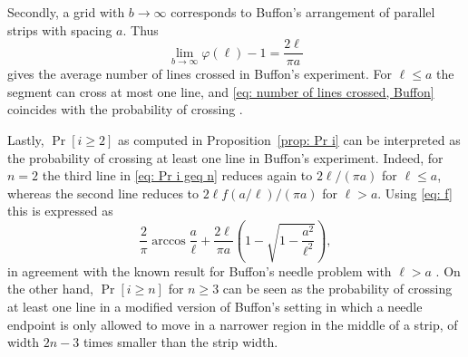 \documentclass[12pt, a4paper]{article}
\newcommand{\funta}{\varphi} %
\newcommand{\len}{\ell} %
\begin{document}
Secondly, a grid with $b \rightarrow \infty$ corresponds to Buffon's arrangement of parallel strips with spacing $a$. Thus
\begin{equation}
\label{eq: number of lines crossed, Buffon}
\lim_{b \rightarrow \infty} \funta(\len)-1 = \frac{2\len}{\pi a}
\end{equation}
gives the average number of lines crossed in Buffon's experiment. For $\len \leq a$ the segment can cross at most one line, and \eqref{eq: number of lines crossed, Buffon} coincides with the probability of crossing \cite[theorem 1.1.1]{Mathai99}.

Lastly, $\Pr[i \geq 2]$ as computed in Proposition~\ref{prop: Pr i} can be interpreted as the probability of crossing at least one line in Buffon's experiment. Indeed, for $n=2$ the third line in \eqref{eq: Pr i geq n} reduces again to $2\len/(\pi a)$ for $\len \leq a$, whereas the second line reduces to $2\len f(a/\len)/(\pi a)$ for $\len > a$. Using \eqref{eq: f} this is expressed as
\[
\frac 2 \pi \arccos\frac a \len + \frac{2\len}{\pi a} \left(1 - \sqrt{1-\frac{a^2}{\len^2}} \right),
\]
in agreement with the known result for Buffon's needle problem with $\len > a$ \cite[theorem 1.1.2]{Mathai99}. On the other hand, $\Pr[i \geq n]$ for $n \geq 3$ can be seen as the probability of crossing at least one line in a modified version of Buffon's setting in which a needle endpoint is only allowed to move in a narrower region in the middle of a strip, of width $2n-3$ times smaller than the strip width. 
\end{document}
